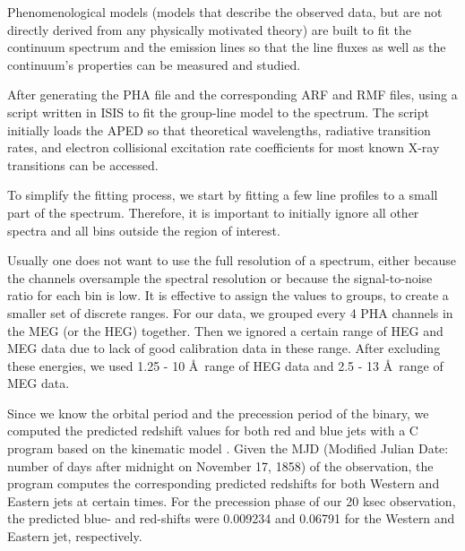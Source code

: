 Phenomenological models (models that describe the observed data, but are not directly derived from any physically motivated theory) are built to fit the continuum spectrum and the emission lines so that the line fluxes as well as the continuum's properties can be measured and studied. \par 

After generating the PHA file and the corresponding ARF and RMF files, using a script written in ISIS to fit the group-line model to the spectrum. The script initially loads the APED so that theoretical wavelengths, radiative transition rates, and electron collisional excitation rate coefficients for most known X-ray transitions can be accessed. \par 
To simplify the fitting process, we start by fitting a few line profiles to a small part of the spectrum. Therefore, it is important to initially ignore all other spectra and all bins outside the region of interest. \par 
Usually one does not want to use the full resolution of a spectrum, either because the channels oversample the spectral resolution or because the signal-to-noise ratio for each bin is low. It is effective to assign the values to groups, to create a smaller set of discrete ranges. For our data, we grouped every 4 PHA channels in the MEG (or the HEG) together. Then we ignored a certain range of HEG and MEG data due to lack of good calibration data in these range. After excluding these energies, we used 1.25 - 10 \AA\ range of HEG data and 2.5 - 13 \AA\ range of MEG data. \par 


Since we know the orbital period and the precession period of the binary, we computed the predicted redshift values for both red and blue jets with a C program based on the kinematic model \citep{Margon1979}. Given the MJD (Modified Julian Date: number of days after midnight on November 17, 1858) of the observation, the program computes the corresponding predicted redshifts for both Western and Eastern jets at certain times. For the precession phase of our 20 ksec observation, the predicted blue- and red-shifts were 0.009234 and 0.06791 for the Western and Eastern jet, respectively. \par

